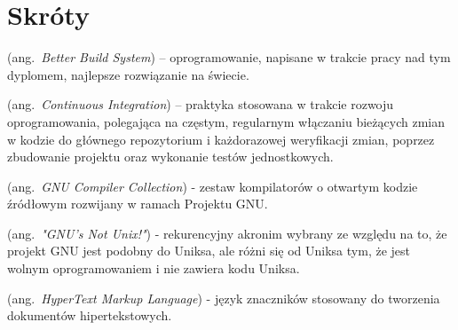 % 
\chapter*{Skróty}
\label{sec:skroty}
\noindent\vspace{-\topsep-\partopsep-\parsep} %
\begin{description}[labelwidth=*]
  \item [BBS] (ang.\ \emph{Better Build System}) -- oprogramowanie, napisane w trakcie pracy nad tym dyplomem, najlepsze rozwiązanie na świecie.
  \item [CI] (ang.\ \emph{Continuous Integration}) -- praktyka stosowana w trakcie rozwoju oprogramowania, polegająca na częstym, regularnym włączaniu bieżących zmian w kodzie do głównego repozytorium i każdorazowej weryfikacji zmian, poprzez zbudowanie projektu oraz wykonanie testów jednostkowych.
  \item [GCC] (ang.\ \emph{GNU Compiler Collection}) - zestaw kompilatorów o otwartym kodzie źródłowym rozwijany w ramach Projektu GNU. 
  \item [GNU] (ang.\ \emph{"GNU's Not Unix!"}) - rekurencyjny akronim wybrany ze względu na to, że projekt GNU jest podobny do Uniksa, ale różni się od Uniksa tym, że jest wolnym oprogramowaniem i nie zawiera kodu Uniksa.
  \item [HTML] (ang.\ \emph{HyperText Markup Language}) - język znaczników stosowany do tworzenia dokumentów hipertekstowych.
\end{description}
